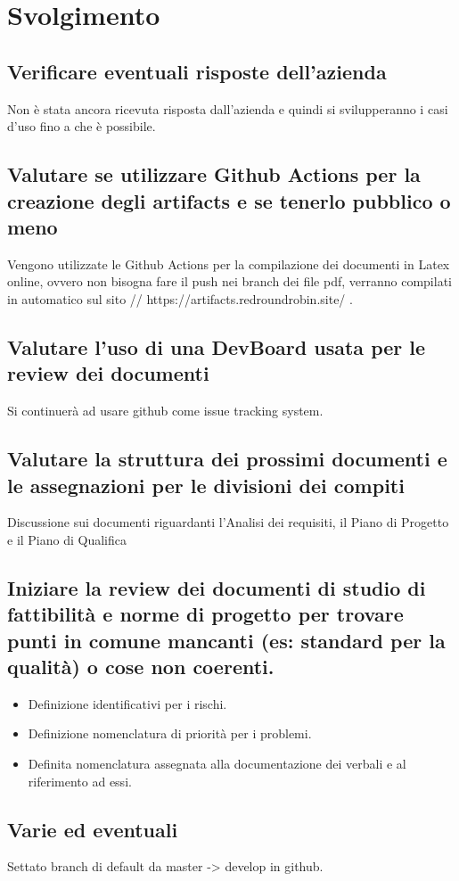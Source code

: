 \newpage
\section*{Svolgimento}

	\subsection*{Verificare eventuali risposte dell'azienda}
		Non è stata ancora ricevuta risposta dall'azienda e quindi si svilupperanno i casi d'uso fino a che è possibile.
	\subsection*{Valutare se utilizzare Github Actions per la creazione degli artifacts e se tenerlo pubblico o meno}
		Vengono utilizzate le Github Actions per la compilazione dei documenti in Latex online, ovvero non bisogna fare il push nei branch dei file pdf, verranno compilati in automatico sul sito // https://artifacts.redroundrobin.site/ .
	\subsection*{Valutare l'uso di una DevBoard usata per le review dei documenti}
		Si continuerà ad usare github come issue tracking system.
	\subsection*{Valutare la struttura dei prossimi documenti e le assegnazioni per le divisioni dei compiti}
		Discussione sui documenti riguardanti l'Analisi dei requisiti, il Piano di Progetto e il Piano di Qualifica
	\subsection*{Iniziare la review dei documenti di studio di fattibilità e norme di progetto per trovare punti in comune mancanti (es: standard per la qualità) o cose non coerenti.}
		\begin{itemize}
			\item Definizione identificativi per i rischi.
			\item Definizione nomenclatura di priorità per i problemi.
			\item Definita nomenclatura assegnata alla documentazione dei verbali e al riferimento ad essi.
		\end{itemize}
	\subsection*{Varie ed eventuali}
		Settato branch di default da master -> develop in github.